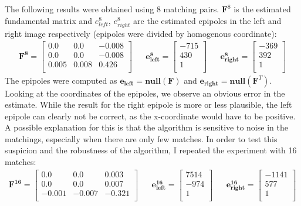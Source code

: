 \documentclass{paper}
\begin{document}
The following results were obtained using 8 matching pairs. $\mathbf{F}^{8}$ is the estimated fundamental matrix and $e^{8}_{left}$, $e^{8}_{right}$ are the estimated epipoles in the left and right image respectively (epipoles were divided by homogenous coordinate):
\begin{align}
\mathbf{F^{8}}= \left[ \begin{array}{ccc}
0.0 & 0.0 & -0.008\\
0.0 & 0.0 & -0.008 \\
0.005 & 0.008 & 0.426 \\
\end{array} \right] \nonumber 
&& \mathbf{e^{8}_{left}}=\left[ \begin{array}{c}
-715 \\
430 \\
1\\
\end{array} \right] \nonumber 
&& \mathbf{e^{8}_{right}}=\left[ \begin{array}{c}
-369 \\
392 \\
1\\
\end{array} \right] \nonumber 
\end{align}
The epipoles were computed as $\mathbf{e_{left}}=\mathbf{null}(\mathbf{F})$ and $\mathbf{e_{right}}=\mathbf{null}(\mathbf{F}^T)$.
Looking at the coordinates of the epipoles, we observe an obvious error in the estimate. While the result for  the right epipole is more or less plausible, the left epipole can clearly not be correct, as the x-coordinate would have to be positive. A possible explanation for this is that the algorithm is sensitive to noise in the matchings, especially when there are only few matches. In order to test this suspicion and the robustness of the algorithm, I repeated the experiment with 16 matches: 
\begin{align}
\mathbf{F^{16}}= \left[ \begin{array}{ccc}
0.0 & 0.0 & 0.003\\
0.0 & 0.0 & 0.007 \\
-0.001 & -0.007 & -0.321 \\
\end{array} \right] \nonumber 
&& \mathbf{e^{16}_{left}}=\left[ \begin{array}{c}
7514 \\
-974 \\
1\\
\end{array} \right] \nonumber 
&& \mathbf{e^{16}_{right}}=\left[ \begin{array}{c}
-1141 \\
577 \\
1\\
\end{array} \right] \nonumber 
\end{align}
\end{document}
